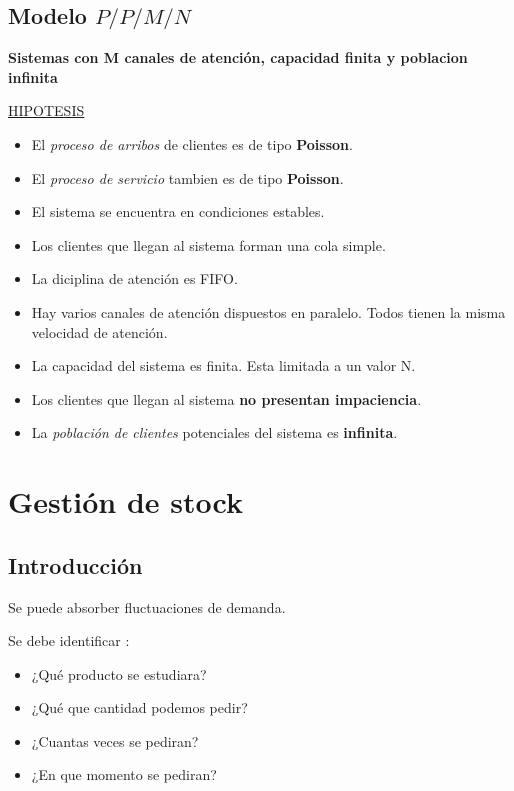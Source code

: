 \documentclass{article}
\begin{document}
\subsection{Modelo \(P/P/M/N\)}

\textbf{Sistemas con M canales de atención, capacidad finita y poblacion infinita}

\noindent
\underline{HIPOTESIS}
\begin{itemize}
    \item El \textit{proceso de arribos} de clientes es de tipo \textbf{Poisson}.
    \item El \textit{proceso de servicio} tambien es de tipo \textbf{Poisson}.
    \item El sistema se encuentra en condiciones estables.
    \item Los clientes que llegan al sistema forman una cola simple.
    \item La diciplina de atención es FIFO.
    \item Hay varios canales de atención dispuestos en paralelo. Todos tienen la misma velocidad de atención.
    \item La capacidad del sistema es finita. Esta limitada a un valor N.
    \item Los clientes que llegan al sistema \textbf{no presentan impaciencia}.
    \item La \textit{población de clientes} potenciales del sistema es \textbf{infinita}.
\end{itemize}

\section{Gestión de stock}

\subsection{Introducción}

Se puede absorber fluctuaciones de demanda.

Se debe identificar :
\begin{itemize}
    \item ¿Qué producto se estudiara?
    \item ¿Qué que cantidad podemos pedir?
    \item ¿Cuantas veces se pediran?
    \item ¿En que momento se pediran?
\end{itemize}
\end{document}
